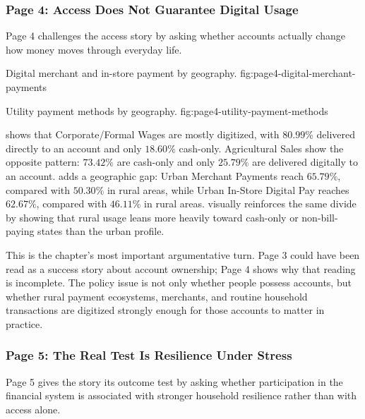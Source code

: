\documentclass[../main.tex]{subfiles}
\begin{document}
\subsubsection{Page 4: Access Does Not Guarantee Digital Usage}
\label{subsubsec:page4-usage}

Page 4 challenges the access story by asking whether accounts actually change
how money moves through everyday life.

{Digital merchant and in-store payment by geography.}
{fig:page4-digital-merchant-payments}

{Utility payment methods by geography.}
{fig:page4-utility-payment-methods}

 shows that
Corporate/Formal Wages are mostly
digitized, with \(80.99\%\) delivered directly to an account and only
\(18.60\%\) cash-only. Agricultural Sales show the opposite pattern:
\(73.42\%\) are cash-only and only \(25.79\%\) are delivered digitally to an
account.  adds a geographic gap:
Urban Merchant Payments reach \(65.79\%\), compared with \(50.30\%\) in rural
areas, while Urban In-Store Digital Pay reaches \(62.67\%\), compared with
\(46.11\%\) in rural areas. 
visually reinforces the same divide by showing that rural usage leans more
heavily toward cash-only or non-bill-paying states than the urban profile.


This is the chapter's most important argumentative turn. Page 3 could have been
read as a success story about account ownership; Page 4 shows why that reading
is incomplete. The policy issue is not only whether people possess accounts,
but whether rural payment ecosystems, merchants, and routine household
transactions are digitized strongly enough for those accounts to matter in
practice.

\subsubsection{Page 5: The Real Test Is Resilience Under Stress}
\label{subsubsec:page5-resilience}

Page 5 gives the story its outcome test by asking whether participation in the
financial system is associated with stronger household resilience rather than
with access alone.
\end{document}
